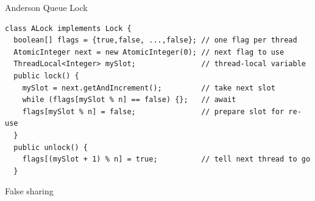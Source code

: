 \begin{frame}[fragile]{Anderson Queue Lock}

\begin{verbatim}
class ALock implements Lock {
  boolean[] flags = {true,false, ...,false}; // one flag per thread
  AtomicInteger next = new AtomicInteger(0); // next flag to use
  ThreadLocal<Integer> mySlot;               // thread-local variable
  public lock() {
    mySlot = next.getAndIncrement();         // take next slot
    while (flags[mySlot % n] == false) {};   // await
    flags[mySlot % n] = false;               // prepare slot for re-use
  }
  public unlock() {
    flags[(mySlot + 1) % n] = true;          // tell next thread to go
  }
\end{verbatim}

\end{frame}

\begin{frame}{False sharing}
\end{frame}

